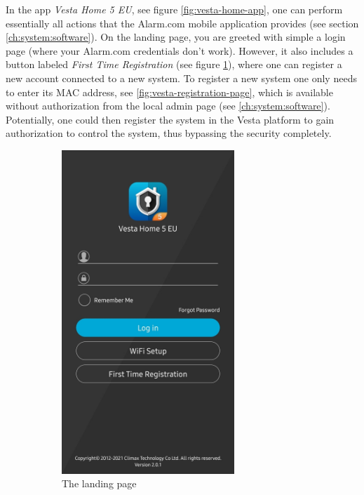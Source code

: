 In the app \textit{Vesta Home 5 EU}, see figure \ref{fig:vesta-home-app}, one can perform essentially all actions that the Alarm.com mobile application provides (see section \ref{ch:system:software}). On the landing page, you are greeted with simple a login page (where your Alarm.com credentials don't work). However, it also includes a button labeled \textit{First Time Registration} (see figure \ref{fig:vesta-landing-page}), where one can register a new account connected to a new system. To register a new system one only needs to enter its MAC address, see \ref{fig:vesta-registration-page}, which is available without authorization from the local admin page (see \ref{ch:system:software}). Potentially, one could then register the system in the Vesta platform to gain authorization to control the system, thus bypassing the security completely.
\begin{figure}[!ht]
    \centering
    \begin{subfigure}[t]{0.5\textwidth}
        \includegraphics[height=4.8in]{images/6-pentesting/vesta-home-landing-page.jpg}
        \caption{The landing page}
        \label{fig:vesta-landing-page}
    \end{subfigure}%
    ~
    \begin{subfigure}[t]{0.5\textwidth}

\end{subfigure}
\end{figure}
